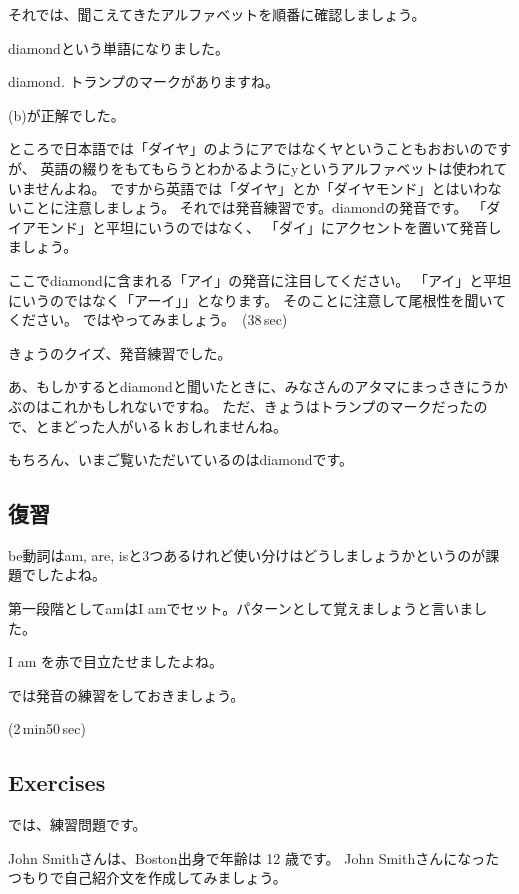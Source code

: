 \documentclass[12pt]{jlreq}
\begin{document}
それでは、聞こえてきたアルファベットを順番に確認しましょう。{\large \ComputerMouse}

{\large \ComputerMouse}


diamondという単語になりました。


diamond.
トランプのマークがありますね。

(b)が正解でした。


ところで日本語では「ダイヤ」のようにアではなくヤということもおおいのですが、
英語の綴りをもてもらうとわかるようにyというアルファベットは使われていませんよね。
ですから英語では「ダイヤ」とか「ダイヤモンド」とはいわないことに注意しましょう。
それでは発音練習です。diamondの発音です。
「ダイアモンド」と平坦にいうのではなく、
「ダイ」にアクセントを置いて発音しましょう。

ここでdiamondに含まれる「アイ」の発音に注目してください。
「アイ」と平坦にいうのではなく「アーイ」」となります。
そのことに注意して尾根性を聞いてください。
ではやってみましょう。
\faVolumeUp\,(38\,sec)

きょうのクイズ、発音練習でした。

{\large \ComputerMouse}

あ、もしかするとdiamondと聞いたときに、みなさんのアタマにまっさきにうかぶのはこれかもしれないですね。
ただ、きょうはトランプのマークだったので、とまどった人がいるｋおしれませんね。

もちろん、いまご覧いただいているのはdiamondです。
{\large \ComputerMouse}

\newpage
\subsection{復習}
be動詞はam, are, isと3つあるけれど使い分けはどうしましょうかというのが課題でしたよね。

第一段階としてamはI amでセット。パターンとして覚えましょうと言いました。

I am を赤で目立たせましたよね。

では発音の練習をしておきましょう。

\faVolumeUp{}(2\,min50\,sec)

\newpage
\subsection{Exercises}
では、練習問題です。

John Smithさんは、Boston出身で年齢は 12 歳です。
John Smithさんになったつもりで自己紹介文を作成してみましょう。
\end{document}
